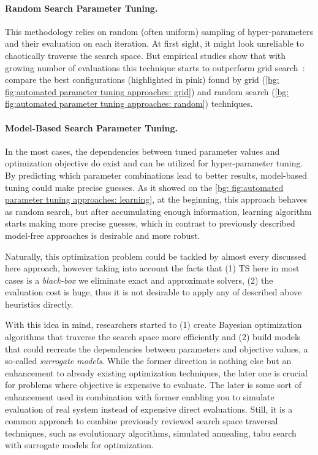 \paragraph{Random Search Parameter Tuning.} This methodology relies on random (often uniform) sampling of hyper-parameters and their evaluation on each iteration. At first sight, it might look unreliable to chaotically traverse the search space. But empirical studies show that with growing number of evaluations this technique starts to outperform grid search~\cite{bergstra2012random}: compare the best configurations (highlighted in pink) found by grid (\cref{bg: fig:automated parameter tuning approaches: grid}) and random search (\cref{bg: fig:automated parameter tuning approaches: random}) techniques.

\paragraph{Model-Based Search Parameter Tuning.} In the most cases, the dependencies between tuned parameter values and optimization objective do exist and can be utilized for hyper-parameter tuning. By predicting which parameter combinations lead to better results, model-based tuning could make precise guesses. As it showed on the \cref{bg: fig:automated parameter tuning approaches: learning}, at the beginning, this approach behaves as random search, but after accumulating enough information, learning algorithm starts making more precise guesses, which in contrast to previously described model-free approaches is desirable and more robust.

Naturally, this optimization problem could be tackled by almost every discussed here approach, however taking into account the facts that (1) TS here in most cases is a \textit{black-box} we eliminate exact and approximate solvers, (2) the evaluation cost is huge, thus it is not desirable to apply any of described above heuristics directly.

With this idea in mind, researchers started to (1) create  Bayesian optimization algorithms that traverse the search space more efficiently and (2) build models that could recreate the dependencies between parameters and objective values, a so-called \textit{surrogate models}. While the former direction is nothing else but an enhancement to already existing optimization techniques, the later one is crucial for problems where objective is expensive to evaluate.
The later is some sort of enhancement used in combination with former enabling you to simulate evaluation of real system instead of expensive direct evaluations. Still, it is a common approach to combine previously reviewed search space traversal techniques, such as evolutionary algorithms, simulated annealing, tabu search with surrogate models for optimization.


